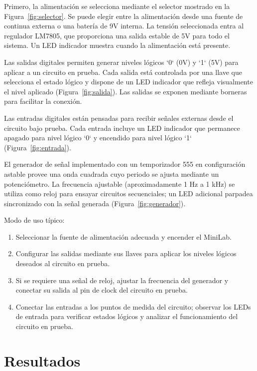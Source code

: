 \documentclass[12pt,a4paper]{article}
\begin{document}
Primero, la alimentación se selecciona mediante el selector mostrado en la Figura~\ref{fig:selector}. Se puede elegir
entre la alimentación desde una fuente de continua externa o una batería de 9V interna. La tensión seleccionada
entra al regulador LM7805, que proporciona una salida estable de 5V para todo el sistema. Un LED indicador muestra
cuando la alimentación está presente.

Las salidas digitales permiten generar niveles lógicos `0` (0V) y `1` (5V) para aplicar a un circuito
en prueba. Cada salida está controlada por una llave que selecciona el estado lógico y dispone de un LED indicador que
refleja visualmente el nivel aplicado (Figura~\ref{fig:salida}). Las salidas se exponen mediante borneras para
facilitar la conexión.

Las entradas digitales están pensadas para recibir señales externas desde el circuito bajo prueba. Cada entrada
incluye un LED indicador que permanece apagado para nivel lógico `0` y encendido para nivel lógico `1`
(Figura~\ref{fig:entrada}).

El generador de señal implementado con un temporizador 555 en configuración astable provee una onda cuadrada cuyo
periodo se ajusta mediante un potenciómetro. La frecuencia ajustable (aproximadamente 1 Hz a 1 kHz) se utiliza como
reloj para ensayar circuitos secuenciales; un LED adicional parpadea sincronizado con la señal generada
(Figura~\ref{fig:generador}).

Modo de uso típico:
\begin{enumerate}
    \item Seleccionar la fuente de alimentación adecuada y encender el MiniLab.
    \item Configurar las salidas mediante sus llaves para aplicar los niveles lógicos deseados al circuito en prueba.
    \item Si se requiere una señal de reloj, ajustar la frecuencia del generador y conectar su salida al pin de clock del circuito en prueba.
    \item Conectar las entradas a los puntos de medida del circuito; observar los LEDs de entrada para verificar estados lógicos y analizar
        el funcionamiento del circuito en prueba.
\end{enumerate}

\section{Resultados}
\end{document}
